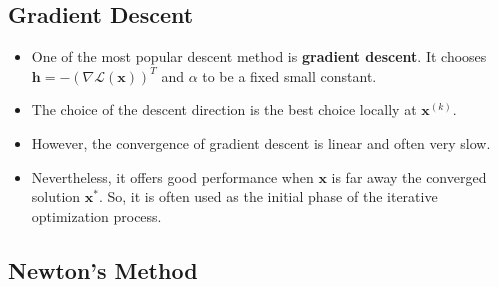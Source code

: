\documentclass[10pt]{article}
\newcommand{\ve}[1]{\mathbf{#1}}
\newcommand{\mcal}[1]{\mathcal{#1}}
\begin{document}
\subsection{Gradient Descent}

\begin{itemize}
    \item One of the most popular descent method is {\bf gradient descent}. It chooses $\ve{h} = -(\nabla \mcal{L}(\ve{x}))^T$  and $\alpha$ to be a fixed small constant.
    
    \item The choice of the descent direction is the best choice locally at $\ve{x}^{(k)}$.
    
    \item However, the convergence of gradient descent is linear and often very slow.
    
    \item Nevertheless, it offers good performance when $\ve{x}$ is far away the converged solution $\ve{x}^*$. So, it is often used as the initial phase of the iterative optimization process.
\end{itemize}

\subsection{Newton's Method}
\end{document}
